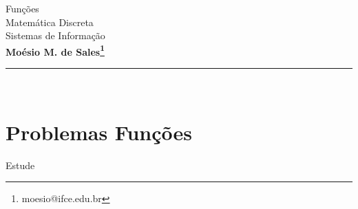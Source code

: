 \documentclass[11pt,a4paper]{article}
\makeatletter
\newcommand{\nome}{\bf Moésio M. de Sales\footnote{moesio@ifce.edu.br}}
\newcommand{\titu}{Funções}
\newcommand{\disc}{Matemática Discreta}
\newcommand{\curso}{Sistemas de Informação}
\makeatother
\begin{document}
{\Large
\begin{center} \titu\\ \disc\\ \curso \\  \nome\end{center}
}
\hfill   %
\hrule\ 
\section{\sc Problemas Funções}

Estude\cite{gersting2004fundamentos,Ed1976teoria,scheinerman2003mat}

\bexer









\eexerc
\printbibliography
\end{document}
